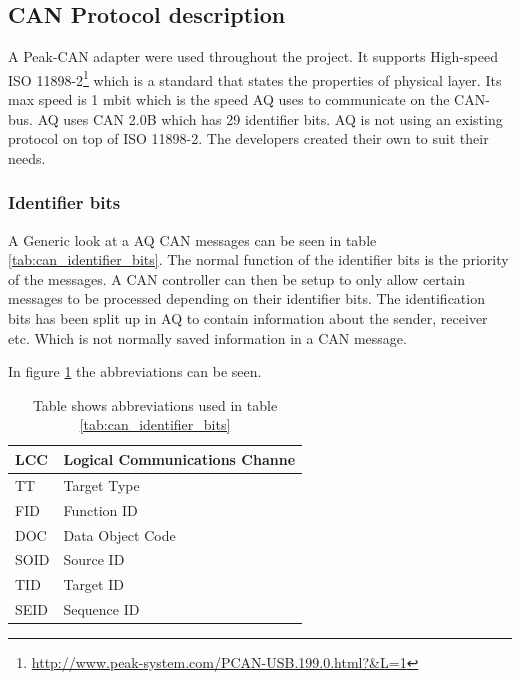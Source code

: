\subsection{CAN Protocol description}
A Peak-CAN adapter were used throughout the project. It supports High-speed ISO 11898-2\footnote{\url{http://www.peak-system.com/PCAN-USB.199.0.html?&L=1}} which is a standard that states the properties of physical layer. 
Its max speed is 1 mbit which is the speed AQ uses to communicate on the CAN-bus. 
AQ uses CAN 2.0B which has 29 identifier bits.
AQ is not using an existing protocol on top of ISO 11898-2. The developers created their own to suit their needs.\\

\subsubsection{Identifier bits}
A Generic look at a AQ CAN messages can be seen in table \ref{tab:can_identifier_bits}.
The normal function of the identifier bits is the priority of the messages.
A CAN controller can then be setup to only allow certain messages to be processed depending on their identifier bits.
The identification bits has been split up in AQ to contain information about the sender, receiver etc. Which is not normally saved information in a CAN message.
\begin{table}[H]
	\caption{Table shows the identifier bits used in AutoQuad CAN messages}
	\label{tab:can_identifier_bits}
\end{table}

In figure \ref{tab:abbri_can_msg} the abbreviations can be seen.
\begin{table}[H]
		\begin{tabular}{|l|l|}
		\hline
		LCC & Logical Communications Channe \\
\hline
		TT & Target Type \\
\hline
		FID & Function ID \\
\hline
		DOC & Data Object Code \\
\hline
		SOID & Source ID \\
\hline
		TID & Target ID \\
\hline
		SEID & Sequence ID \\
\hline
		\end{tabular}
		\caption{Table shows 
abbreviations used in table \ref{tab:can_identifier_bits}}
		\label{tab:abbri_can_msg}
\end{table}

